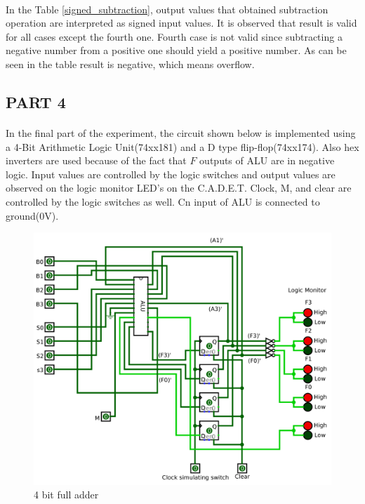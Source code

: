 \documentclass[pdftex,12pt,a4paper]{article}
\begin{document}
\begin{flushleft}
\paragraph{}
In the Table \ref{signed_subtraction}, output values that obtained subtraction operation are interpreted as signed input values. It is observed that result is valid for all cases except the fourth one. Fourth case is not valid since subtracting a negative number from a positive one should yield a positive number. As can be seen in the table result is negative, which means overflow. 


\subsection{PART 4}

\paragraph{}

In the final part of the experiment, the circuit shown below is implemented using a 4-Bit Arithmetic Logic Unit(74xx181) and a D type flip-flop(74xx174). Also hex inverters are used because of the fact that $F$ outputs of ALU are in negative logic. Input values are controlled by the logic switches and output values are observed on the logic monitor LED's on the C.A.D.E.T. Clock, M, and clear are controlled by the logic switches as well. Cn input of ALU is connected to ground(0V).



\end{flushleft}
\begin{figure}[h]
    	\centering
    	\includegraphics[width=1\textwidth]{part4.png}	
    	\caption{4 bit full adder}
    	\label{fig:4-bit_full_adder}
    \end{figure}
\end{document}
